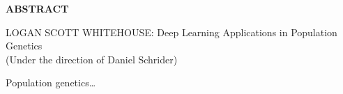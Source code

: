 
\begin{center}
\vspace*{52pt}
{\normalfont\textbf{ABSTRACT}}
\vspace{11pt}

\begin{singlespace}
LOGAN SCOTT WHITEHOUSE: Deep Learning Applications in Population Genetics \\
(Under the direction of Daniel Schrider)
\end{singlespace}
\end{center}

Population genetics\dots

\clearpage
